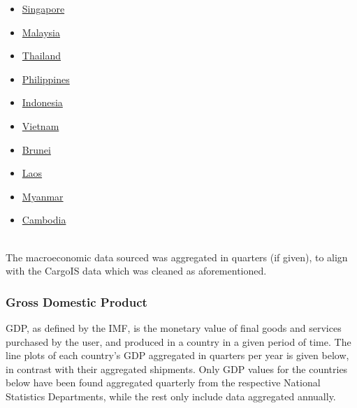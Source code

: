 \documentclass{article}
\begin{document}
\begin{multicols}{2}
    \begin{itemize} 
        \item \href{https://www.singstat.gov.sg/}{Singapore}
        \item \href{https://www.data.gov.my/}{Malaysia}
        \item \href{https://www.nesdc.go.th/nesdb_en/main.php?filename=index}{Thailand}
        \item \href{https://psa.gov.ph/}{Philippines}
        \item \href{https://www.bps.go.id/}{Indonesia}
    \end{itemize}
    
    \columnbreak
    
    \begin{itemize}
        \item \href{https://www.gso.gov.vn/en/homepage/}{Vietnam}
        \item \href{https://deps.mofe.gov.bn/Theme/Home.aspx}{Brunei}
        \item \href{https://www.lsb.gov.la/en/home/}{Laos}
        \item \href{https://www.mmsis.gov.mm/}{Myanmar}
        \item \href{https://www.nis.gov.kh/index.php/km/}{Cambodia}
    \end{itemize}

\end{multicols} \\

\noindent The macroeconomic data sourced was aggregated in quarters (if given), to align with the CargoIS data which was cleaned as aforementioned. 


\subsubsection{Gross Domestic Product}
GDP, as defined by the IMF, is the monetary value of final goods and services purchased by the user, and produced in a country in a given period of time. The line plots of each country's GDP aggregated in quarters per year is given below, in contrast with their aggregated shipments. Only GDP values for the countries below have been found aggregated quarterly from the respective National Statistics Departments, while the rest only include data aggregated annually.

\newpage
\end{document}
